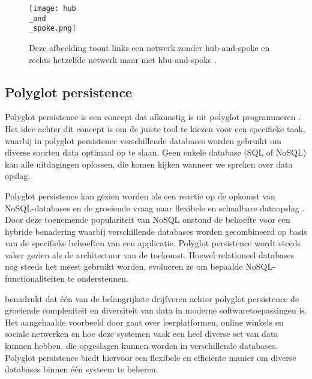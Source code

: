 \begin{figure}[H]
	\centering
	\texttt{[image: hub\\\_and\\\_spoke.png]}
	\caption[Voorstelling van een hub-and-spoke]{\label{fig:hub-and-spoke}Deze afbeelding toont links een netwerk zonder hub-and-spoke en rechts hetzelfde netwerk maar met hbu-and-spoke \autocite{Zhou2021}.}
\end{figure}

\subsection{Polyglot persistence}
\label{sec:Polyglot Persistence}

Polyglot persistence is een concept dat afkomstig is uit polyglot programmeren \autocite{Kazanavicius2022}. Het idee achter dit concept is om de juiste tool te kiezen voor een specifieke taak, waarbij in polyglot persistence verschillende databases worden gebruikt om diverse soorten data optimaal op te slaan. Geen enkele database (SQL of NoSQL) kan alle uitdagingen oplossen, die komen kijken wanneer we spreken over data opslag.

Polyglot persistence kan gezien worden als een reactie op de opkomst van NoSQL-databases en de groeiende vraag naar flexibele en schaalbare dataopslag \autocite{Candel2022}. Door deze toenemende populariteit van NoSQL onstond de behoefte voor een hybride benadering waarbij verschillende databases worden gecombineerd op basis van de specifieke behoeften van een applicatie. Polyglot persistence wordt steeds vaker gezien als de architectuur van de toekomst. Hoewel relationeel databases nog steeds het meest gebruikt worden, evolueren ze om bepaalde NoSQL-functionaliteiten te ondersteunen.

\textcite{Candel2022} benadrukt dat één van de belangrijkste drijfveren achter polyglot persistence de groeiende complexiteit en diversiteit van data in moderne softwaretoepassingen is. Het aangehaalde voorbeeld door \textcite{Candel2022} gaat over leerplatformen, online winkels en sociale netwerken en hoe deze systemen vaak een heel diverse set van data kunnen hebben, die opgeslagen kunnen worden in verschillende databases. Polyglot persistence biedt  hiervoor een flexibele en efficiënte manier om diverse databases binnen één systeem te beheren.


